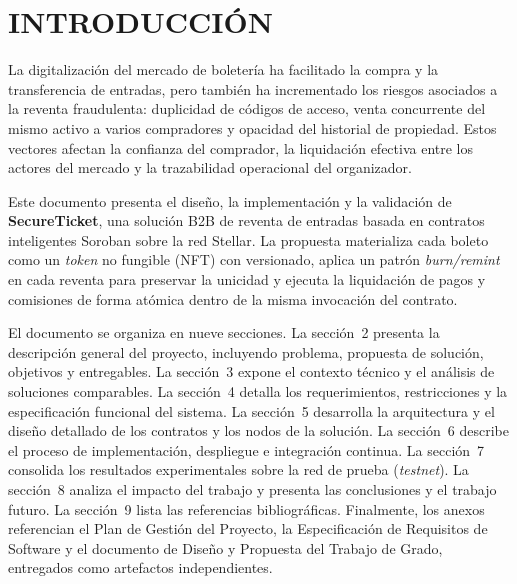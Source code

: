 \section{INTRODUCCIÓN}

La digitalización del mercado de boletería ha facilitado la compra y la transferencia de entradas, pero
también ha 
incrementado los riesgos asociados a la reventa fraudulenta: duplicidad de códigos de acceso, venta
concurrente del 
mismo activo a varios compradores y opacidad del historial de propiedad. Estos vectores afectan la confianza
del 
comprador, la liquidación efectiva entre los actores del mercado y la trazabilidad operacional del
organizador.

Este documento presenta el diseño, la implementación y la validación de \textbf{SecureTicket}, una solución
B2B de 
reventa de entradas basada en contratos inteligentes Soroban sobre la red Stellar. La propuesta materializa
cada 
boleto como un \textit{token} no fungible (NFT) con versionado, aplica un patrón \textit{burn/remint} en cada
reventa 
para preservar la unicidad y ejecuta la liquidación de pagos y comisiones de forma atómica dentro de la misma
invocación del contrato.

El documento se organiza en nueve secciones. La sección~2 presenta la descripción general del proyecto,
incluyendo 
problema, propuesta de solución, objetivos y entregables. La sección~3 expone el contexto técnico y el
análisis de 
soluciones comparables. La sección~4 detalla los requerimientos, restricciones y la especificación funcional
del sistema. 
La sección~5 desarrolla la arquitectura y el diseño detallado de los contratos y los nodos de la solución. La
sección~6 
describe el proceso de implementación, despliegue e integración continua. La sección~7 consolida los
resultados 
experimentales sobre la red de prueba (\textit{testnet}). La sección~8 analiza el impacto del trabajo y
presenta las 
conclusiones y el trabajo futuro. La sección~9 lista las referencias bibliográficas. Finalmente, los anexos
referencian 
el Plan de Gestión del Proyecto, la Especificación de Requisitos de Software y el documento de Diseño y
Propuesta del 
Trabajo de Grado, entregados como artefactos independientes.
